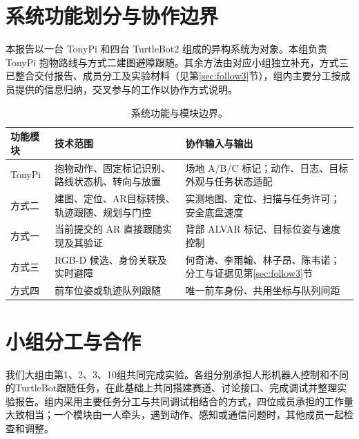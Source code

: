 \section{系统功能划分与协作边界}\label{sec:division}
本报告以一台 TonyPi 和四台 TurtleBot2 组成的异构系统为对象。本组负责 TonyPi 抱物路线与方式二建图避障跟随。其余方法由对应小组独立补充，方式三已整合交付报告、成员分工及实验材料（见第\ref{sec:follow3}节），组内主要分工按成员提供的信息归纳，交叉参与的工作以协作方式说明。
\begin{table}[H]\centering\small
\begin{tabularx}{\linewidth}{p{27mm}YY}\toprule
功能模块 & 技术范围 & 协作输入与输出\\\midrule
TonyPi & 抱物动作、固定标记识别、路线状态机、转向与放置 & 场地 A/B/C 标记；动作、日志、目标外观与任务状态适配\\
方式二 & 建图、定位、AR目标转换、轨迹跟随、规划与门控 & 实测地图、定位、扫描与任务许可；安全底盘速度\\
方式一 & 当前提交的 AR 直接跟随实现及其验证 & 背部 ALVAR 标记、目标位姿与速度控制\\
方式三 & RGB-D 候选、身份关联及实时避障 & 何奇涛、李雨翰、林子昂、陈韦诺；分工与证据见第\ref{sec:follow3}节\\
方式四 & 前车位姿或轨迹队列跟随 & 唯一前车身份、共用坐标与队列间距\\\bottomrule
\end{tabularx}\caption{系统功能与模块边界。}
\section{小组分工与合作}\label{sec:division}
我们大组由第1、2、3、10组共同完成实验。各组分别承担人形机器人控制和不同的TurtleBot跟随任务，在此基础上共同搭建赛道、讨论接口、完成调试并整理实验报告。组内采用主要任务分工与共同调试相结合的方式，四位成员承担的工作量大致相当；一个模块由一人牵头，遇到动作、感知或通信问题时，其他成员一起检查和调整。


\end{table}
